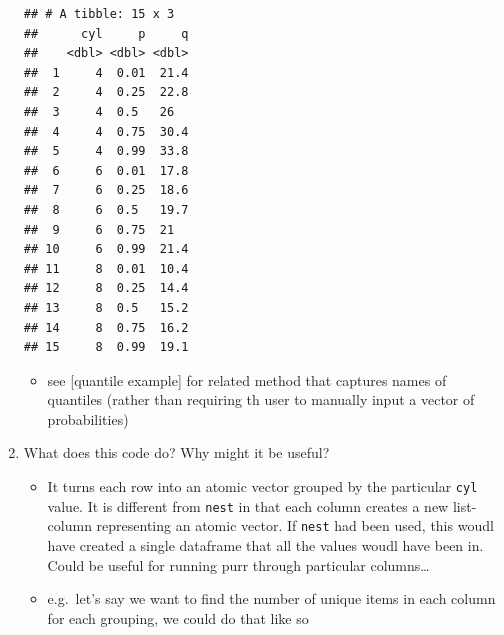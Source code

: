 \documentclass[]{book}
\newenvironment{Shaded}{\begin{snugshade}}{\end{snugshade}}
\newcommand{\DecValTok}[1]{\textcolor[rgb]{0.00,0.00,0.81}{#1}}
\newcommand{\KeywordTok}[1]{\textcolor[rgb]{0.13,0.29,0.53}{\textbf{#1}}}
\newcommand{\NormalTok}[1]{#1}
\newcommand{\OperatorTok}[1]{\textcolor[rgb]{0.81,0.36,0.00}{\textbf{#1}}}
\newcommand{\StringTok}[1]{\textcolor[rgb]{0.31,0.60,0.02}{#1}}
\providecommand{\tightlist}{%
  \setlength{\itemsep}{0pt}\setlength{\parskip}{0pt}}
\theoremstyle{definition}
\theoremstyle{definition}
\theoremstyle{definition}
\theoremstyle{remark}
\begin{document}
\begin{enumerate}
\begin{verbatim}
## # A tibble: 15 x 3
##      cyl     p     q
##    <dbl> <dbl> <dbl>
##  1     4  0.01  21.4
##  2     4  0.25  22.8
##  3     4  0.5   26  
##  4     4  0.75  30.4
##  5     4  0.99  33.8
##  6     6  0.01  17.8
##  7     6  0.25  18.6
##  8     6  0.5   19.7
##  9     6  0.75  21  
## 10     6  0.99  21.4
## 11     8  0.01  10.4
## 12     8  0.25  14.4
## 13     8  0.5   15.2
## 14     8  0.75  16.2
## 15     8  0.99  19.1
\end{verbatim}

  \begin{itemize}
  \tightlist
  \item
    see {[}quantile example{]} for related method that captures names of
    quantiles (rather than requiring th user to manually input a vector
    of probabilities)
  \end{itemize}
\item
  What does this code do? Why might it be useful?

\begin{Shaded}
\end{Shaded}

  \begin{itemize}
  \tightlist
  \item
    It turns each row into an atomic vector grouped by the particular
    \texttt{cyl} value. It is different from \texttt{nest} in that each
    column creates a new list-column representing an atomic vector. If
    \texttt{nest} had been used, this woudl have created a single
    dataframe that all the values woudl have been in. Could be useful
    for running purr through particular columns\ldots{}
  \item
    e.g.~let's say we want to find the number of unique items in each
    column for each grouping, we could do that like so
  \end{itemize}


\end{enumerate}
\end{document}
